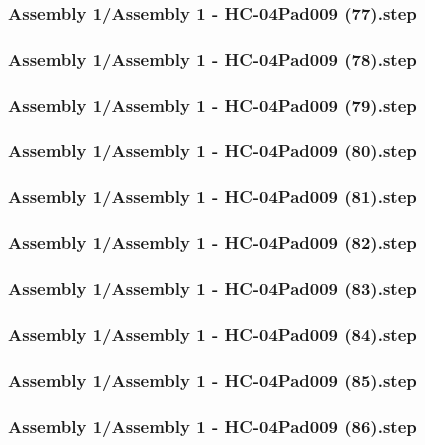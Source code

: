 \documentclass[a4paper,12pt]{article}
\begin{document}
\begin{lstlising}[language=C++]
\subsubsection{Assembly 1/Assembly 1 - HC-04Pad009 (77).step}

\subsubsection{Assembly 1/Assembly 1 - HC-04Pad009 (78).step}

\subsubsection{Assembly 1/Assembly 1 - HC-04Pad009 (79).step}

\subsubsection{Assembly 1/Assembly 1 - HC-04Pad009 (80).step}

\subsubsection{Assembly 1/Assembly 1 - HC-04Pad009 (81).step}

\subsubsection{Assembly 1/Assembly 1 - HC-04Pad009 (82).step}

\subsubsection{Assembly 1/Assembly 1 - HC-04Pad009 (83).step}

\subsubsection{Assembly 1/Assembly 1 - HC-04Pad009 (84).step}

\subsubsection{Assembly 1/Assembly 1 - HC-04Pad009 (85).step}

\subsubsection{Assembly 1/Assembly 1 - HC-04Pad009 (86).step}


\end{lstlising}
\end{document}

